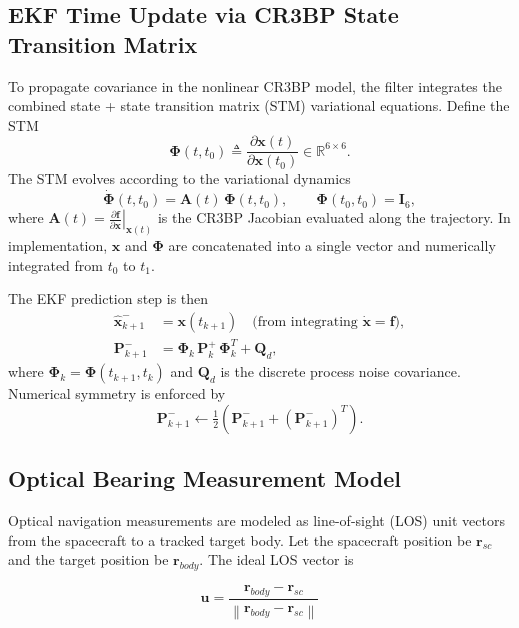 \documentclass[twocolumn]{article}
\begin{document}
\subsection{EKF Time Update via CR3BP State Transition Matrix}
To propagate covariance in the nonlinear CR3BP model, the filter integrates the combined state + state transition matrix (STM) variational equations. Define the STM
\begin{equation}
\boldsymbol{\Phi}(t,t_0) \triangleq \frac{\partial \mathbf{x}(t)}{\partial \mathbf{x}(t_0)} \in \mathbb{R}^{6\times 6}.
\end{equation}
The STM evolves according to the variational dynamics
\begin{equation}
\dot{\boldsymbol{\Phi}}(t,t_0) = \mathbf{A}(t)\,\boldsymbol{\Phi}(t,t_0), \qquad
\boldsymbol{\Phi}(t_0,t_0)=\mathbf{I}_{6},
\end{equation}
where $\mathbf{A}(t)=\left.\frac{\partial \mathbf{f}}{\partial \mathbf{x}}\right|_{\mathbf{x}(t)}$ is the CR3BP Jacobian evaluated along the trajectory. In implementation, $\mathbf{x}$ and $\boldsymbol{\Phi}$ are concatenated into a single vector and numerically integrated from $t_0$ to $t_1$.

The EKF prediction step is then
\begin{align}
\hat{\mathbf{x}}^-_{k+1} &= \mathbf{x}(t_{k+1}) \quad \text{(from integrating $\dot{\mathbf{x}}=\mathbf{f}$)},\\
\mathbf{P}^-_{k+1} &= \boldsymbol{\Phi}_{k}\,\mathbf{P}^{+}_{k}\,\boldsymbol{\Phi}_{k}^{T} + \mathbf{Q}_{d},
\end{align}
where $\boldsymbol{\Phi}_{k}=\boldsymbol{\Phi}(t_{k+1},t_k)$ and $\mathbf{Q}_d$ is the discrete process noise covariance. Numerical symmetry is enforced by
\begin{equation}
\mathbf{P}^-_{k+1} \leftarrow \tfrac{1}{2}\left(\mathbf{P}^-_{k+1} + (\mathbf{P}^-_{k+1})^{T}\right).
\end{equation}

\subsection{Optical Bearing Measurement Model}

Optical navigation measurements are modeled as line-of-sight (LOS) unit vectors from the spacecraft to a tracked target body. Let the spacecraft position be $\mathbf{r}_{sc}$ and the target position be $\mathbf{r}_{body}$. The ideal LOS vector is

\begin{equation}
\mathbf{u} =
\frac{\mathbf{r}_{body}-\mathbf{r}_{sc}}
{\left\|\mathbf{r}_{body}-\mathbf{r}_{sc}\right\|}
\end{equation}
\end{document}
